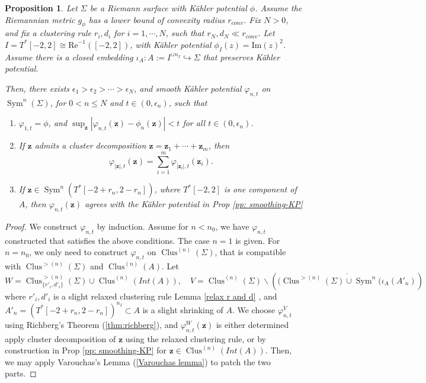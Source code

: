 \documentclass{article}
\def\C{\mathbb{C}}
\def\In{\subset}
\def\RM{\backslash}
\def\into{\hookrightarrow}
\DeclareMathOperator{\Sym}{Sym}
\DeclareMathOperator{\Clus}{Clus}
\renewcommand{\Im}{\mathrm{Im}}
\renewcommand{\Re}{\mathrm{Re}}
\def\bz{\mathbf{z}} %
\newtheorem{proposition}[theorem]{Proposition}
\theoremstyle{definition}
\begin{document}
\begin{proposition} \label{pp:smoothing-KP-general}
    Let $\Sigma$ be a Riemann surface with K\"ahler potential   $\phi$. Assume the Riemannian metric $g_\phi$ has a lower bound of convexity radius $r_{conv}$. Fix $N>0$, and fix a clustering rule $r_i, d_i$ for $i=1,\cdots, N$, such that $r_N, d_N \ll r_{conv}$. Let $I = T^*[-2,2] \cong \Re^{-1}([-2,2])$, with K\"ahler potential $\phi_I(z) = \Im(z)^2$. Assume there is a closed embedding $\iota_A: A := I^{\sqcup n_I} \into \Sigma$ that preserves K\"ahler potential. 
    
     Then, there exists $\epsilon_1 > \epsilon_2 >\cdots > \epsilon_N$, and smooth K\"ahler potential $\varphi_{n,t} $ on $\Sym^n(\Sigma)$, for $0 < n \leq N$ and $t \in (0, \epsilon_n)$, such that 
    \begin{enumerate}
        \item $\varphi_{1,t} = \phi$, and $\sup_{\bz}|\varphi_{n,t}(\bz) - \phi_n(\bz)| < t$ for all $t \in (0, \epsilon_n)$. 
        \item \label{general Sigma, KP factorize} If $\bz$ admits a cluster decomposition $\bz = \bz_1 + \cdots + \bz_m$, then 
        $$ \varphi_{|\bz|,t}(\bz) = \sum_{i=1}^m \varphi_{|\bz_i|,t}(\bz_i). $$
        \item If $\bz \in \Sym^n (T^*[-2+r_n,2-r_n])$, where $T^*[-2,2]$ is one component of $A$, then $\varphi_{n,t}(\bz)$ agrees with the K\"ahler potential in Prop \ref{pp: smoothing-KP}
    \end{enumerate}
\end{proposition}
\begin{proof}
    We construct $\varphi_{n,t}$ by induction. Assume for $n < n_0$, we have $\varphi_{n,t}$ constructed that satisfies the above conditions.  The case $n=1$ is given. 
    For $n=n_0$, we only need to construct $\varphi_{n,t}$ on $\Clus^{(n)}(\Sigma)$, that is compatible with $\Clus^{>(n)}(\Sigma)$ and $\Clus^{(n)}(A)$. Let 
    $$W = \Clus^{>(n)}_{\{r'_i, d'_i\}}(\Sigma) \cup \Clus^{(n)}(Int(A)), \quad  V = \Clus^{(n)}(\Sigma) \RM ( \overline{(\Clus^{>(n)} (\Sigma) \cup \Sym^n(\iota_A(A'_n)}) $$
    where $r'_i, d'_i$ is a slight relaxed clustering rule Lemma \ref{relax r and d}
    , and $A'_n = (T^*[-2+r_n, 2-r_n])^{n_I} \In A$ is a slight shrinking of $A$. We choose $\varphi_{n,t}^V$ using Richberg's Theorem (\ref{thm:richberg}), and $\varphi^W_{n,t}(\bz)$ is either determined apply cluster decomposition of $\bz$ using the relaxed clustering rule, or by construction in Prop \ref{pp: smoothing-KP} for $\bz \in \Clus^{(n)}(Int(A))$. Then, we may apply Varouchas's Lemma (\ref{Varouchas lemma}) to patch the two parts. 
\end{proof}
\end{document}
